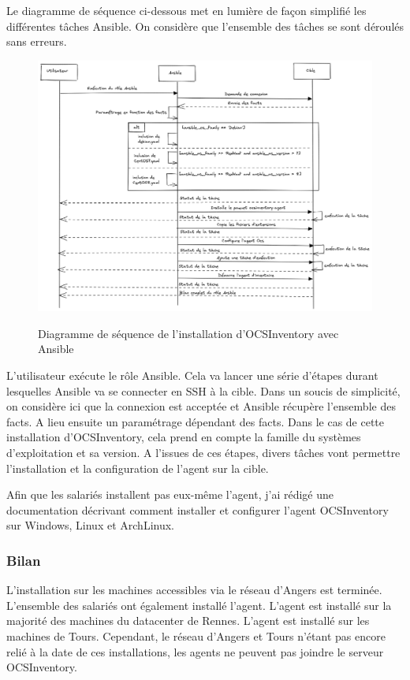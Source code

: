\documentclass[12pt]{article}
\begin{document}
\newpage
Le diagramme de séquence ci-dessous met en lumière de façon simplifié les différentes tâches Ansible. On considère que l'ensemble des tâches se sont déroulés sans erreurs.

\begin{figure}[!ht]
    \centering
    \includegraphics[width=\textwidth]{src/Ansible OCS.png}
    \label{fig:ansible_ocs}
    \caption{Diagramme de séquence de l'installation d'OCSInventory avec Ansible}
\end{figure}

L'utilisateur exécute le rôle Ansible.
Cela va lancer une série d'étapes durant lesquelles Ansible va se connecter en SSH à la cible.
Dans un soucis de simplicité, on considère ici que la connexion est acceptée et Ansible récupère l'ensemble des facts.
A lieu ensuite un paramétrage dépendant des facts. 
Dans le cas de cette installation d'OCSInventory, cela prend en compte la famille du systèmes d'exploitation et sa version.
A l'issues de ces étapes, divers tâches vont permettre l'installation et la configuration de l'agent sur la cible.

Afin que les salariés installent pas eux-même l'agent, j'ai rédigé une documentation décrivant comment installer et configurer l'agent OCSInventory sur Windows, Linux et ArchLinux.
\newpage
\subsubsection{Bilan}
L'installation sur les machines accessibles via le réseau d'Angers est terminée.
L'ensemble des salariés ont également installé l'agent.
L'agent est installé sur la majorité des machines du datacenter de Rennes.
L'agent est installé sur les machines de Tours. 
Cependant, le réseau d'Angers et Tours n'étant pas encore relié à la date de ces installations, les agents ne peuvent pas joindre le serveur OCSInventory.
\end{document}

